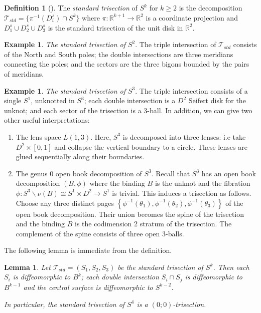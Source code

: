\documentclass[11pt]{amsart}
\newtheorem{lemma}[theorem]{Lemma}
\theoremstyle{definition}
\newtheorem{definition}[theorem]{Definition}
\newtheorem{example}[theorem]{Example}
\theoremstyle{remark}
\numberwithin{equation}{section}
\newcommand{\cT}{\mathcal{T}}
\begin{document}
\begin{definition}[\cite{LC-Miller}]
\label{def:standard-tri-sphere}
The {\it standard trisection} of $S^{k}$ for $k\ge 2$ %
is the decomposition $\cT_{std} = \{\pi^{-1}(D^s_i) \cap S^{k}\}$ where $\pi: \mathbb{R}^{k+1} \rightarrow \mathbb{R}^2$ is a coordinate projection and $D^s_1 \cup D^s_2 \cup D^s_3$ is the standard trisection of the unit disk in $\mathbb{R}^2$.
\end{definition}

\begin{example}
\textit{The standard trisection of $S^2$}.  The triple intersection of $\cT_{std}$ consists of the North and South poles; the double intersections are three meridians connecting the poles; and the sectors are the three bigons bounded by the pairs of meridians.
\end{example}


\begin{example}
\label{ex:std-tri-s3}
\textit{The standard trisection of $S^3$}.  The triple intersection consists of a single $S^1$, unknotted in $S^3$; each double intersection is a $D^2$ Seifert disk for the unknot; and each sector of the trisection is a 3-ball.  In addition, we can give two other useful interpretations:
\begin{enumerate}
\item The lens space $L(1,3)$.  Here, $S^3$ is decomposed into three lenses: i.e take $D^2 \times [0,1]$ and collapse the vertical boundary to a circle.  These lenses are glued sequentially along their boundaries.
\item The genus 0 open book decomposition of $S^3$. Recall that $S^3$ has an open book decomposition $(B,\phi)$ where the binding $B$ is the unknot and the fibration $\phi: S^3 \smallsetminus \nu(B) \cong S^1 \times D^2 \rightarrow S^1$ is trivial.  This induces a trisection as follows.  Choose any three distinct pages $\left\{\phi^{-1}(\theta_1),\phi^{-1}(\theta_2), \phi^{-1}(\theta_3)\right\}$ of the open book decomposition.  Their union becomes the spine of the trisection and the binding $B$ is the codimension 2 stratum of the trisection.  The complement of the spine consists of three open 3-balls.
\end{enumerate}
\end{example}



The following lemma is immediate from the definition.

\begin{lemma}
\label{lemma:std}
Let $\cT_{std} = (S_1,S_2,S_3)$ be the standard trisection of $S^{k}$.  Then each $S_i$ is diffeomorphic to $B^{k}$; each double intersection $S_i \cap S_j$ is diffeomorphic to $B^{k-1}$ and the central surface is diffeomorphic to $S^{k-2}$.

In particular, the standard trisection of $S^4$ is a $(0;0)$-trisection.
\end{lemma}
\end{document}
